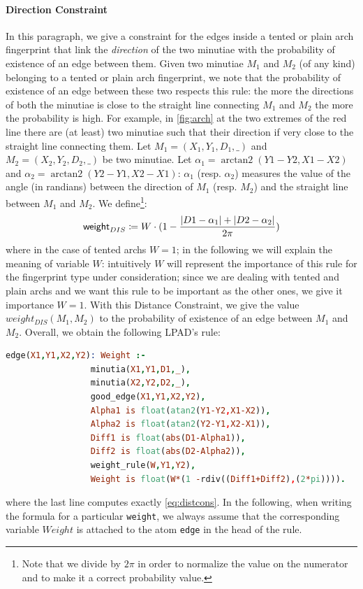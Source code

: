 \documentclass[8pt]{article}
\DeclareMathOperator{\arctantwo}{arctan2}
\begin{document}
\paragraph{Direction Constraint}
In this paragraph, we give a constraint for the edges inside a tented or plain
arch fingerprint that link the \emph{direction} of the two minutiae with the
probability of existence of an edge between them.  Given two minutiae $M_1$ and
$M_2$ (of any kind) belonging to a tented or plain arch fingerprint, we note
that the probability of existence of an edge between these two respects this
rule: the more the directions of both the minutiae is close to the straight
line connecting $M_1$ and $M_2$ the more the probability is high.  For example,
in \cref{fig:arch} at the two extremes of the red line there are (at least) two
minutiae such that their direction if very close to the straight line
connecting them.  Let $M_1=(X_1,Y_1,D_1,\_)$ and $M_2=(X_2,Y_2,D_2,\_)$ be two
minutiae.  Let $\alpha_1=\arctantwo(Y1-Y2,X1-X2)$ and
$\alpha_2=\arctantwo(Y2-Y1,X2-X1)$: $\alpha_1$ (resp. $\alpha_2$) measures the
value of the angle (in randians) between the direction of $M_1$ (resp. $M_2$)
and the straight line between $M_1$ and $M_2$.  We define\footnote{Note that we
divide by $2\pi$ in order to normalize the value on the numerator and to make
it a correct probability value.}:
  \begin{align}\label{eq:distcons}
    \textsf{weight}_{DIS} \coloneqq
    W \cdot (1-\frac{\lvert D1-\alpha_1\rvert+\lvert D2-\alpha_2\rvert}{2\pi})
  \end{align}
where in the case of tented archs $W=1$; in the following we will explain the
meaning of variable $W$: intuitively $W$ will represent the importance of this
rule for the fingerprint type under consideration; since we are dealing with
tented and plain archs and we want this rule to be important as the other ones,
we give it importance $W=1$. With this Distance Constraint, we give the value
$weight_{DIS}(M_1,M_2)$ to the probability of existence of an edge between
$M_1$ and $M_2$. Overall, we obtain the following LPAD's rule:
  \begin{lstlisting}[language=Prolog,frame = single,basicstyle=\footnotesize\ttfamily]
edge(X1,Y1,X2,Y2): Weight :-
                 minutia(X1,Y1,D1,_),
                 minutia(X2,Y2,D2,_),
                 good_edge(X1,Y1,X2,Y2),
                 Alpha1 is float(atan2(Y1-Y2,X1-X2)),
                 Alpha2 is float(atan2(Y2-Y1,X2-X1)),
                 Diff1 is float(abs(D1-Alpha1)),
                 Diff2 is float(abs(D2-Alpha2)),
                 weight_rule(W,Y1,Y2),
                 Weight is float(W*(1 -rdiv((Diff1+Diff2),(2*pi)))). 
  \end{lstlisting}
where the last line computes exactly \cref{eq:distcons}. In the following, when
writing the formula for a particular \texttt{weight}, we always assume that the
corresponding variable $Weight$ is attached to the atom \texttt{edge} in the
head of the rule.
\end{document}
